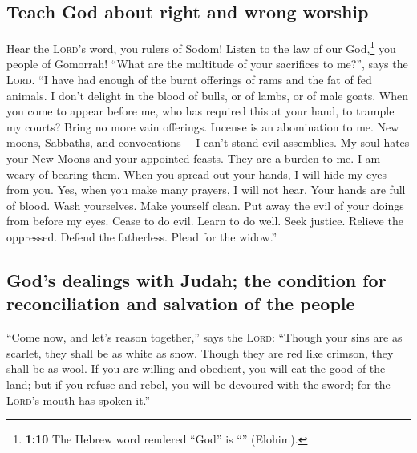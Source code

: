 \hypertarget{teach-god-about-right-and-wrong-worship}{%
\subsection{Teach God about right and wrong
worship}\label{teach-god-about-right-and-wrong-worship}}

 Hear the \textsc{Lord}'s word, you rulers of Sodom!
Listen to the law of our God,\footnote{\textbf{1:10} The Hebrew word
  rendered ``God'' is ``'' (Elohim).} you people of
Gomorrah!  ``What are the multitude of your sacrifices to
me?'', says the \textsc{Lord}. ``I have had enough of the burnt
offerings of rams and the fat of fed animals. I don't delight in the
blood of bulls, or of lambs, or of male goats.  When you
come to appear before me, who has required this at your hand, to trample
my courts?  Bring no more vain offerings. Incense is an
abomination to me. New moons, Sabbaths, and convocations--- I can't
stand evil assemblies.  My soul hates your New Moons and
your appointed feasts. They are a burden to me. I am weary of bearing
them.  When you spread out your hands, I will hide my
eyes from you. Yes, when you make many prayers, I will not hear. Your
hands are full of blood.  Wash yourselves. Make yourself
clean. Put away the evil of your doings from before my eyes. Cease to do
evil.  Learn to do well. Seek justice. Relieve the
oppressed. Defend the fatherless. Plead for the widow.''

\hypertarget{gods-dealings-with-judah-the-condition-for-reconciliation-and-salvation-of-the-people}{%
\subsection{God's dealings with Judah; the condition for reconciliation
and salvation of the
people}\label{gods-dealings-with-judah-the-condition-for-reconciliation-and-salvation-of-the-people}}

 ``Come now, and let's reason together,'' says the
\textsc{Lord}: ``Though your sins are as scarlet, they shall be as white
as snow. Though they are red like crimson, they shall be as wool.
 If you are willing and obedient, you will eat the good
of the land;  but if you refuse and rebel, you will be
devoured with the sword; for the \textsc{Lord}'s mouth has spoken it.''

